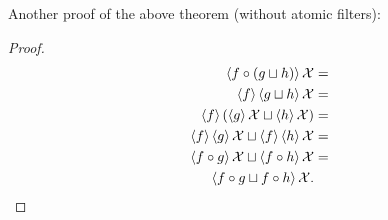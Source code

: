 Another proof of the above theorem (without atomic filters):
\begin{proof}
~
\begin{align*}
\supfun{f\circ(g\sqcup h)}\mathcal{X} & =\\
\supfun f\supfun{g\sqcup h}\mathcal{X} & =\\
\supfun f(\supfun g\mathcal{X}\sqcup\supfun h\mathcal{X}) & =\\
\supfun f\supfun g\mathcal{X}\sqcup\supfun f\supfun h\mathcal{X} & =\\
\supfun{f\circ g}\mathcal{X}\sqcup\supfun{f\circ h}\mathcal{X} & =\\
\supfun{f\circ g\sqcup f\circ h}\mathcal{X}.
\end{align*}

\end{proof}

